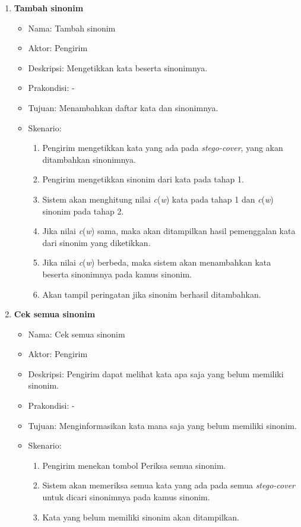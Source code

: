 \begin{enumerate}
	\item \textbf{Tambah sinonim}
	\begin{itemize}
		\item Nama: Tambah sinonim
		\item Aktor: Pengirim
		\item Deskripsi: Mengetikkan kata beserta sinonimnya.
		\item Prakondisi: -
		\item Tujuan: Menambahkan daftar kata dan sinonimnya.
		\item Skenario:
			\begin{enumerate}
				\item Pengirim mengetikkan kata yang ada pada \textit{stego-cover}, yang akan ditambahkan sinonimnya.
				\item Pengirim mengetikkan sinonim dari kata pada tahap 1.
				\item Sistem akan menghitung nilai \textit{c}(\textit{w}) kata pada tahap 1 dan \textit{c}(\textit{w}) sinonim pada tahap 2.
				\item Jika nilai \textit{c}(\textit{w}) sama, maka akan ditampilkan hasil pemenggalan kata dari sinonim yang diketikkan.
				\item Jika nilai \textit{c}(\textit{w}) berbeda, maka sistem akan menambahkan kata beserta sinonimnya pada kamus sinonim.
				\item Akan tampil peringatan jika sinonim berhasil ditambahkan.
			\end{enumerate}
	\end{itemize}
	
	\item \textbf{Cek semua sinonim}
	\begin{itemize}
		\item Nama: Cek semua sinonim
		\item Aktor: Pengirim
		\item Deskripsi: Pengirim dapat melihat kata apa saja yang belum memiliki sinonim.
		\item Prakondisi: -
		\item Tujuan: Menginformasikan kata mana saja yang belum memiliki sinonim.
		\item Skenario:
			\begin{enumerate}
				\item Pengirim menekan tombol Periksa semua sinonim.
				\item Sistem akan memeriksa semua kata yang ada pada semua \textit{stego-cover} untuk dicari sinonimnya pada kamus sinonim.
				\item Kata yang belum memiliki sinonim akan ditampilkan.
			\end{enumerate}
	\end{itemize}
	

\end{enumerate}
